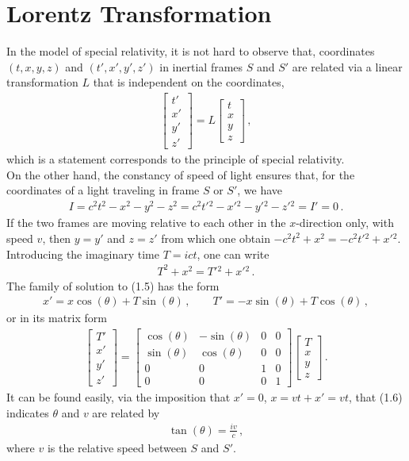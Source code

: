 \documentclass[11pt, onesided]{book}
\theoremstyle{break}
\theoremstyle{break}
\newcommand{\bmat}[1]{\begin{bmatrix} #1 \end{bmatrix}}
\begin{document}
\section[Lorentz Transformation]{\color{red} Lorentz Transformation\color{black}}
In the model of special relativity, it is not hard to observe that, coordinates $(t,x,y,z)$ and $(t',x',y',z')$ in inertial frames $S$ and $S'$ are related via a linear transformation $L$ that is independent on the coordinates,
\begin{align*}
\bmat{t'\\x'\\y'\\z'} = L \bmat{t\\x\\y\\z}\,,
\end{align*}
which is a statement corresponds to the principle of special relativity.\\

On the other hand, the constancy of speed of light ensures that, for the coordinates of a light traveling in frame $S$ or $S'$, we have
\begin{align*}
I = c^2t^2 - x^2 - y^2 - z^2 = c^2t'{}^2 - x'{}^2 - y'{}^2 - z'{}^2 =  I' = 0\,.
\end{align*}
If the two frames are moving relative to each other in the $x$-direction only, with speed $v$, then $y=y'$ and $z=z'$ from which one obtain $-c^2 t^2 + x^2 = -c^2 t'{}^2 + x'{}^2$. Introducing the imaginary time $T = ict$, one can write
\begin{align}
T^2 +x^2 = T'{}^2 + x'{}^2\,.
\end{align}
The family of solution to (1.5) has the form
\begin{align}
x' = x \cos(\theta) + T\sin(\theta)\,,\qquad T'= -x\sin(\theta) + T\cos(\theta)\,,
\end{align}
or in its matrix form
\begin{align}
\bmat{T' \\ x' \\ y' \\ z'} = \bmat{\cos(\theta) & -\sin(\theta) & 0  & 0 \\
\sin(\theta) & \cos(\theta) & 0& 0\\
0 & 0 & 1 & 0\\
0 & 0 & 0 & 1}
\bmat{T \\ x \\ y \\z}\,.
\end{align}
It can be found easily, via the imposition that $x' = 0$, $x = vt+x' = vt$, that (1.6) indicates $\theta$ and $v$ are related by
\begin{align*}
\tan(\theta)  = \frac{iv}{c}\,,
\end{align*}
where $v$ is the relative speed between $S$ and $S'$.\\
\end{document}
